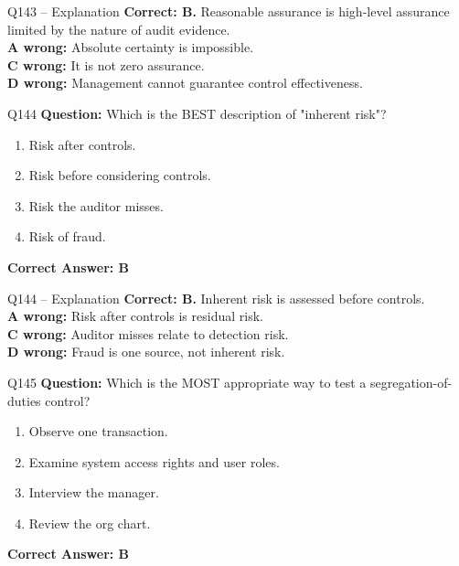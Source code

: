 \documentclass[aspectratio=169,10pt]{beamer}
\begin{document}
	\begin{frame}[t]{Q143 -- Explanation}
		\small
		\textbf{Correct: B.} Reasonable assurance is high-level assurance limited by the nature of audit evidence. \\[4pt]
		\textbf{A wrong:} Absolute certainty is impossible. \\[2pt]
		\textbf{C wrong:} It is not zero assurance. \\[2pt]
		\textbf{D wrong:} Management cannot guarantee control effectiveness.
	\end{frame}
	
	\begin{frame}[t]{Q144}
		\small
		\textbf{Question:} Which is the BEST description of "inherent risk"?
		\begin{enumerate}[label=\Alph*.,itemsep=1pt,topsep=2pt]
			\item Risk after controls.
			\item Risk before considering controls.
			\item Risk the auditor misses.
			\item Risk of fraud.
		\end{enumerate}
		\vspace{4pt}
		\textbf{Correct Answer: B}
	\end{frame}
	
	\begin{frame}[t]{Q144 -- Explanation}
		\small
		\textbf{Correct: B.} Inherent risk is assessed before controls. \\[4pt]
		\textbf{A wrong:} Risk after controls is residual risk. \\[2pt]
		\textbf{C wrong:} Auditor misses relate to detection risk. \\[2pt]
		\textbf{D wrong:} Fraud is one source, not inherent risk.
	\end{frame}
	
	\begin{frame}[t]{Q145}
		\small
		\textbf{Question:} Which is the MOST appropriate way to test a segregation-of-duties control?
		\begin{enumerate}[label=\Alph*.,itemsep=1pt,topsep=2pt]
			\item Observe one transaction.
			\item Examine system access rights and user roles.
			\item Interview the manager.
			\item Review the org chart.
		\end{enumerate}
		\vspace{4pt}
		\textbf{Correct Answer: B}
	\end{frame}
	
\end{document}
